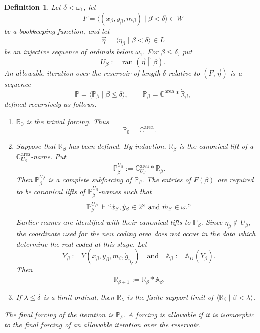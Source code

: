 \documentclass[a4paper,11pt]{article}
\newtheorem{definition}[theorem]{Definition}
\newcommand{\forceP}{\mathbb{P}}
\newcommand{\forceR}{\mathbb{R}}
\newcommand{\forceA}{\mathbb{A}}
\newcommand{\forceC}{\mathbb{C}}
\begin{document}
\begin{definition}\label{definition-allowable-iteration}
Let $\delta<\omega_1$, let
\[
   F=\langle
      (\dot x_\beta,\dot y_\beta,\dot m_\beta)
      \mid\beta<\delta
   \rangle\in W
\]
be a bookkeeping function, and let
\[
   \vec\eta=\langle\eta_\beta\mid\beta<\delta\rangle\in L
\]
be an injective sequence of ordinals below $\omega_1$.  For
$\beta\leq\delta$, put
\[
   U_\beta:=\operatorname{ran}(\vec\eta\upharpoonright\beta).
\]
An \emph{allowable iteration over the reservoir of length $\delta$ relative
to $(F,\vec\eta)$} is a sequence
\[
   \forceP=\langle\forceP_\beta\mid\beta\leq\delta\rangle,
   \qquad
   \forceP_\beta=\forceC^{\mathrm{area}}*\dot{\forceR}_\beta,
\]
defined recursively as follows.
\begin{enumerate}
   \item $\dot{\forceR}_0$ is the trivial forcing.  Thus
   \[
      \forceP_0=\forceC^{\mathrm{area}}.
   \]

   \item Suppose that $\dot{\forceR}_\beta$ has been defined.  By induction,
   $\dot{\forceR}_\beta$ is the canonical lift of a
   $\forceC^{\mathrm{area}}_{U_\beta}$-name.  Put
   \[
      \forceP_\beta^{U_\beta}
      :=\forceC^{\mathrm{area}}_{U_\beta}*\dot{\forceR}_\beta.
   \]
   Then $\forceP_\beta^{U_\beta}$ is a complete subforcing of
   $\forceP_\beta$.  The entries of $F(\beta)$ are required to be canonical
   lifts of $\forceP_\beta^{U_\beta}$-names such that
   \[
      \forceP_\beta^{U_\beta}\Vdash
      ``\dot x_\beta,\dot y_\beta\in2^\omega
      \text{ and }\dot m_\beta\in\omega."
   \]
   Earlier names are identified with their canonical lifts to
   $\forceP_\beta$.  Since $\eta_\beta\notin U_\beta$, the coordinate used
   for the new coding area does not occur in the data which determine the
   real coded at this stage.  Let
   \[
      \dot Y_\beta
      :=\dot Y(\dot x_\beta,\dot y_\beta,\dot m_\beta,
               \dot g_{\eta_\beta})
      \quad\text{and}\quad
      \dot{\forceA}_\beta:=\mathbb A_D(\dot Y_\beta).
   \]
   Then
   \[
      \dot{\forceR}_{\beta+1}
      :=\dot{\forceR}_\beta*\dot{\forceA}_\beta.
   \]

   \item If $\lambda\leq\delta$ is a limit ordinal, then
   $\dot{\forceR}_\lambda$ is the finite-support limit of
   $\langle\dot{\forceR}_\beta\mid\beta<\lambda\rangle$.
\end{enumerate}
The final forcing of the iteration is $\forceP_\delta$.  A forcing is
\emph{allowable} if it is isomorphic to the final forcing of an allowable
iteration over the reservoir.


\end{definition}
\end{document}
